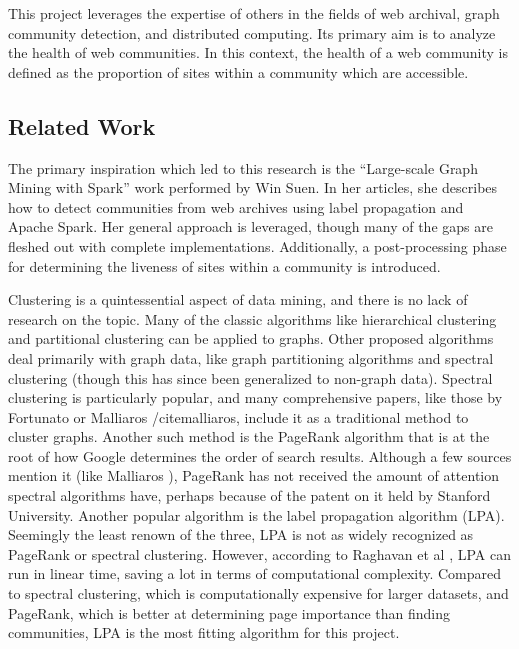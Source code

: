 \documentclass[conference]{IEEEtran}
\begin{document}
This project leverages the expertise of others in the fields of web archival, graph community detection, and distributed computing. Its primary aim is to analyze the health of web communities. In this context, the health of a web community is defined as the proportion of sites within a community which are accessible.

\subsection{Related Work}

The primary inspiration which led to this research is the ``Large-scale Graph Mining with Spark'' work performed by Win Suen. In her articles\cite{largeScaleGraphMiningWithSpark1}\cite{largeScaleGraphMiningWithSpark2}, she describes how to detect communities from web archives using label propagation and Apache Spark. Her general approach is leveraged, though many of the gaps are fleshed out with complete implementations. Additionally, a post-processing phase for determining the liveness of sites within a community is introduced.

Clustering is a quintessential aspect of data mining, and there is no lack of research on the topic. Many of the classic algorithms like hierarchical clustering and partitional clustering can be applied to graphs. Other proposed algorithms deal primarily with graph data, like graph partitioning algorithms and spectral clustering (though this has since been generalized to non-graph data).  Spectral clustering is particularly popular, and many comprehensive papers, like those by Fortunato \cite{fortunato} or Malliaros /cite{malliaros}, include it as a traditional method to cluster graphs. Another such method is the PageRank algorithm that is at the root of how Google determines the order of search results. Although a few sources mention it (like Malliaros \cite{malliaros}), PageRank has not received the amount of attention spectral algorithms have, perhaps because of the patent on it held by Stanford University. Another popular algorithm is the label propagation algorithm (LPA). Seemingly the least renown of the three, LPA is not as widely recognized as PageRank or spectral clustering. However, according to Raghavan et al \cite{raghavan}, LPA can run in linear time, saving a lot in terms of computational complexity. Compared to spectral clustering, which is computationally expensive for larger datasets, and PageRank, which is better at determining page importance than finding communities, LPA is the most fitting algorithm for this project.
\end{document}
